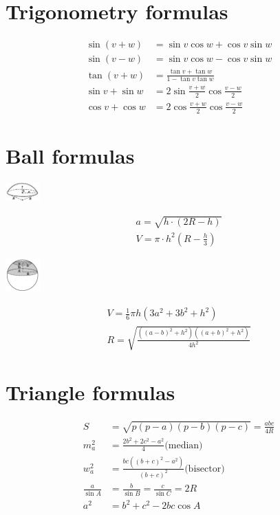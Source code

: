 \section*{Trigonometry formulas}
\begin{align*}
\sin(v+w)&=\sin v\cos w+\cos v\sin w\\
\sin(v-w)&=\sin v\cos w-\cos v\sin w\\
\tan(v+w)&=\frac{\tan v+\tan w}{1-\tan v\tan w}\\
\sin v+\sin w&=2\sin\tfrac{v+w}{2}\cos\tfrac{v-w}{2}\\
\cos v+\cos w&=2\cos\tfrac{v+w}{2}\cos\tfrac{v-w}{2}
\end{align*}

\section*{Ball formulas}

\begin{center}
  \includegraphics[width=0.1\textwidth]{content/mathematics/ball-segment.png}
\end{center}

\[\begin{array}{cc}
  a = \sqrt{h \cdot (2R - h)}\\
  V = \pi \cdot h^2(R -\frac{h}{3})
\end{array}\]

\begin{center}
  \includegraphics[width=0.1\textwidth, center]{content/mathematics/ball-layer.png}
\end{center}

\[\begin{array}{cc}
  V = \frac{1}{6}\pi h(3a^2+3b^2+h^2)\\
  R = \sqrt{\frac{((a - b)^2 + h^2)((a + b)^2 + h^2)}{4h^2}}
\end{array}\]  

\section*{Triangle formulas}
\begin{align*}
S &= \sqrt{p(p - a)(p - b)(p - c)} = \frac{abc}{4R}\\
m_a^2 &= \frac{2b^2 + 2c^2 - a^2}{4} \text{(median)}\\
w_a^2 &= \frac{bc((b + c)^2 - a^2)}{(b + c)^2} \text{(bisector)}\\
\frac{a}{\sin A} &= \frac{b}{\sin B} = \frac{c}{\sin C} = 2R\\
a^2 &= b^2 + c^2 - 2bc\cos A
\end{align*}

